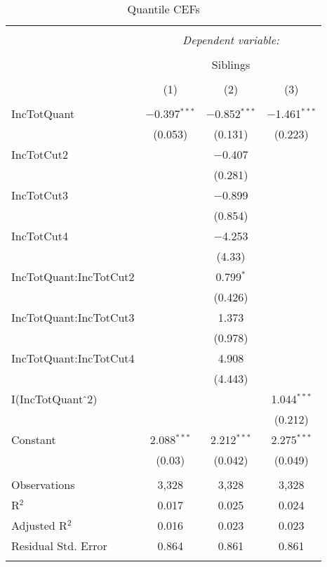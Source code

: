 
\begin{table}[!htbp] \centering 
  \caption{Quantile CEFs} 
  \label{} 
\begin{tabular}{@{\extracolsep{5pt}}lccc} 
\\[-1.8ex]\hline 
\hline \\[-1.8ex] 
 & \multicolumn{3}{c}{\textit{Dependent variable:}} \\ 
\cline{2-4} 
\\[-1.8ex] & \multicolumn{3}{c}{Siblings} \\ 
\\[-1.8ex] & (1) & (2) & (3)\\ 
\hline \\[-1.8ex] 
 IncTotQuant & $-$0.397$^{***}$ & $-$0.852$^{***}$ & $-$1.461$^{***}$ \\ 
  & (0.053) & (0.131) & (0.223) \\ 
  IncTotCut2 &  & $-$0.407 &  \\ 
  &  & (0.281) &  \\ 
  IncTotCut3 &  & $-$0.899 &  \\ 
  &  & (0.854) &  \\ 
  IncTotCut4 &  & $-$4.253 &  \\ 
  &  & (4.33) &  \\ 
  IncTotQuant:IncTotCut2 &  & 0.799$^{*}$ &  \\ 
  &  & (0.426) &  \\ 
  IncTotQuant:IncTotCut3 &  & 1.373 &  \\ 
  &  & (0.978) &  \\ 
  IncTotQuant:IncTotCut4 &  & 4.908 &  \\ 
  &  & (4.443) &  \\ 
  I(IncTotQuant$\hat{\mkern6mu}$2) &  &  & 1.044$^{***}$ \\ 
  &  &  & (0.212) \\ 
  Constant & 2.088$^{***}$ & 2.212$^{***}$ & 2.275$^{***}$ \\ 
  & (0.03) & (0.042) & (0.049) \\ 
 \hline \\[-1.8ex] 
Observations & 3,328 & 3,328 & 3,328 \\ 
R$^{2}$ & 0.017 & 0.025 & 0.024 \\ 
Adjusted R$^{2}$ & 0.016 & 0.023 & 0.023 \\ 
Residual Std. Error & 0.864 & 0.861 & 0.861 \\ 
\hline 
\hline \\[-1.8ex] 
\end{tabular} 
\end{table} 
